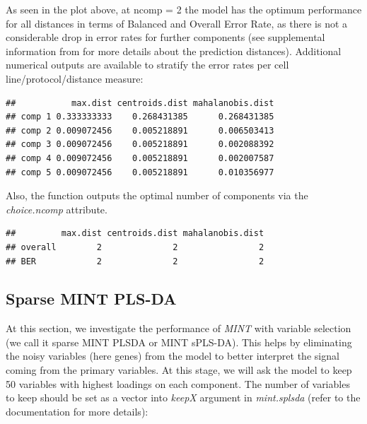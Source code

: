 \documentclass[]{book}
\newenvironment{Shaded}{\begin{snugshade}}{\end{snugshade}}
\newcommand{\CommentTok}[1]{\textcolor[rgb]{0.56,0.35,0.01}{\textit{#1}}}
\newcommand{\NormalTok}[1]{#1}
\newcommand{\OperatorTok}[1]{\textcolor[rgb]{0.81,0.36,0.00}{\textbf{#1}}}
\theoremstyle{definition}
\theoremstyle{definition}
\theoremstyle{definition}
\theoremstyle{remark}
\begin{document}
As seen in the plot above, at ncomp = 2 the model has the optimum
performance for all distances in terms of Balanced and Overall Error
Rate, as there is not a considerable drop in error rates for further
components (see supplemental information from \citep{R-mixOmics} for
more details about the prediction distances). Additional numerical
outputs are available to stratify the error rates per cell
line/protocol/distance measure:

\begin{Shaded}
\end{Shaded}

\begin{verbatim}
##           max.dist centroids.dist mahalanobis.dist
## comp 1 0.333333333    0.268431385      0.268431385
## comp 2 0.009072456    0.005218891      0.006503413
## comp 3 0.009072456    0.005218891      0.002088392
## comp 4 0.009072456    0.005218891      0.002007587
## comp 5 0.009072456    0.005218891      0.010356977
\end{verbatim}

Also, the function outputs the optimal number of components via the
\emph{choice.ncomp} attribute.

\begin{Shaded}
\end{Shaded}

\begin{verbatim}
##         max.dist centroids.dist mahalanobis.dist
## overall        2              2                2
## BER            2              2                2
\end{verbatim}

\hypertarget{sparse-mint-pls-da}{%
\subsection{Sparse MINT PLS-DA}\label{sparse-mint-pls-da}}

At this section, we investigate the performance of \emph{MINT} with
variable selection (we call it sparse MINT PLSDA or MINT sPLS-DA). This
helps by eliminating the noisy variables (here genes) from the model to
better interpret the signal coming from the primary variables. At this
stage, we will ask the model to keep 50 variables with highest loadings
on each component. The number of variables to keep should be set as a
vector into \emph{keepX} argument in \emph{mint.splsda} (refer to the
documentation for more details):
\end{document}
